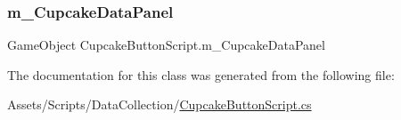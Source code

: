 \mbox{\label{class_cupcake_button_script_a88dc31ad5e0020c230f951d63d78258a}} 
\subsubsection{\texorpdfstring{m\_CupcakeDataPanel}{m\_CupcakeDataPanel}}
{\footnotesize\ttfamily Game\+Object Cupcake\+Button\+Script.\+m\+\_\+\+Cupcake\+Data\+Panel}



The documentation for this class was generated from the following file\+:\begin{DoxyCompactItemize}
\item 
Assets/\+Scripts/\+Data\+Collection/\mbox{\hyperlink{_cupcake_button_script_8cs}{Cupcake\+Button\+Script.\+cs}}\end{DoxyCompactItemize}
